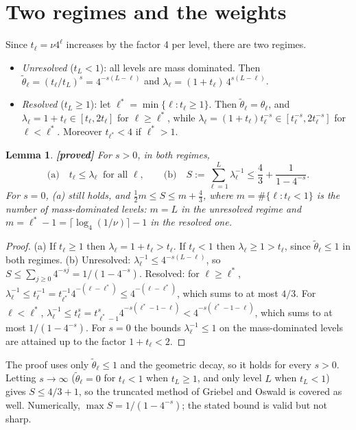 \documentclass[11pt,a4paper]{article}
\newtheorem{lemma}[theorem]{Lemma}
\theoremstyle{remark}
\begin{document}
\section{Two regimes and the weights}

Since $t_\ell=\nu4^\ell$ increases by the factor 4 per level, there are two
regimes.
\begin{itemize}
\item \emph{Unresolved} ($t_L<1$): all levels are mass dominated. Then
  $\tilde\theta_\ell=(t_\ell/t_L)^s=4^{-s(L-\ell)}$ and $\lambda_\ell=(1+t_\ell)\,4^{s(L-\ell)}$.
\item \emph{Resolved} ($t_L\ge1$): let $\ell^*=\min\{\ell:t_\ell\ge1\}$. Then $\tilde\theta_\ell=\theta_\ell$, and
  $\lambda_\ell=1+t_\ell\in[t_\ell,2t_\ell]$ for $\ell\ge\ell^*$, while
  $\lambda_\ell=(1+t_\ell)t_\ell^{-s}\in[t_\ell^{-s},2t_\ell^{-s}]$ for $\ell<\ell^*$. Moreover $t_{\ell^*}<4$ if
  $\ell^*>1$.
\end{itemize}

\begin{lemma}\label{lem:lambda}\textbf{[proved]} For $s>0$, in both regimes,
\[
\text{(a)}\quad t_\ell\le\lambda_\ell\ \text{ for all }\ell,\qquad
\text{(b)}\quad S:=\sum_{\ell=1}^L\lambda_\ell^{-1}\le\frac43+\frac1{1-4^{-s}} .
\]
For $s=0$, (a) still holds, and $\tfrac12m\le S\le m+\tfrac43$, where
$m=\#\{\ell:t_\ell<1\}$ is the number of mass-dominated levels: $m=L$ in the
unresolved regime and $m=\ell^*-1=\lceil\log_4(1/\nu)\rceil-1$ in the resolved one.
\end{lemma}
\begin{proof}
(a) If $t_\ell\ge1$ then $\lambda_\ell=1+t_\ell>t_\ell$. If $t_\ell<1$ then $\lambda_\ell\ge1>t_\ell$, since
$\tilde\theta_\ell\le1$ in both regimes.
(b) Unresolved: $\lambda_\ell^{-1}\le4^{-s(L-\ell)}$, so $S\le\sum_{j\ge0}4^{-sj}=1/(1-4^{-s})$.
Resolved: for $\ell\ge\ell^*$, $\lambda_\ell^{-1}\le t_\ell^{-1}=t_{\ell^*}^{-1}4^{-(\ell-\ell^*)}\le4^{-(\ell-\ell^*)}$, which sums to
at most $4/3$. For $\ell<\ell^*$, $\lambda_\ell^{-1}\le t_\ell^s=t_{\ell^*-1}^s4^{-s(\ell^*-1-\ell)}<4^{-s(\ell^*-1-\ell)}$, which
sums to at most $1/(1-4^{-s})$. For $s=0$ the bounds $\lambda_\ell^{-1}\le1$ on the mass-dominated
levels are attained up to the factor $1+t_\ell<2$.
\end{proof}

\noindent The proof uses only $\tilde\theta_\ell\le1$ and the geometric decay, so it
holds for every $s>0$. Letting $s\to\infty$ ($\tilde\theta_\ell=0$ for $t_\ell<1$ when
$t_L\ge1$, and only level $L$ when $t_L<1$) gives $S\le4/3+1$, so the
truncated method of Griebel and Oswald is covered as well. Numerically,
$\max S=1/(1-4^{-s})$; the stated bound is valid but not sharp.
\end{document}
